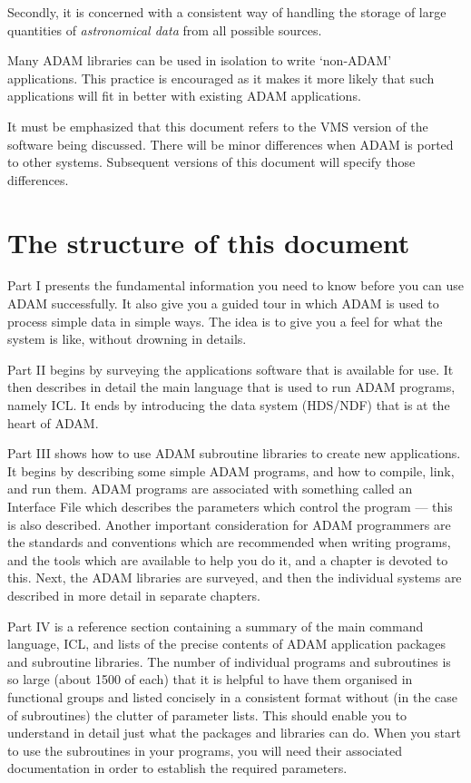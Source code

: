 Secondly, it is concerned with a consistent way of handling the storage of
large quantities of {\em astronomical data} from all possible sources.

Many ADAM libraries can be used in isolation to write `non-ADAM' applications.
This practice is encouraged as it makes it more likely that such applications
will fit in better with existing ADAM applications.

It must be emphasized that this document refers to the VMS version of the
software being discussed.
There will be minor differences when ADAM is ported to other systems.
Subsequent versions of this document will specify those differences.

\section{The structure of this document}
\label{S_strucdoc}

Part I presents the fundamental information you need to know before you can
use ADAM successfully.
It also give you a guided tour in which ADAM is used to process simple data
in simple ways.
The idea is to give you a feel for what the system is like, without drowning
in details.

Part II begins by surveying the applications software that is available for use.
It then describes in detail the main language that is used to run ADAM programs,
namely ICL.
It ends by introducing the data system (HDS/NDF) that is at the heart of ADAM.

Part III shows how to use ADAM subroutine libraries to create new applications.
It begins by describing some simple ADAM programs, and how to compile, link,
and run them.
ADAM programs are associated with something called an Interface File which
describes the parameters which control the program --- this is also described.
Another important consideration for ADAM programmers are the standards and
conventions which are recommended when writing programs, and the tools which
are available to help you do it, and a chapter is devoted to this.
Next, the ADAM libraries are surveyed, and then the individual systems are
described in more detail in separate chapters.

Part IV is a reference section containing a summary of the main command
language, ICL, and lists of the precise contents of ADAM application packages
and subroutine libraries.
The number of individual programs and subroutines is so large (about 1500 of
each) that it is helpful to have them organised in functional groups and listed
concisely in a consistent format without (in the case of subroutines) the
clutter of parameter lists.
This should enable you to understand in detail just what the packages and
libraries can do.
When you start to use the subroutines in your programs, you will need their
associated documentation in order to establish the required parameters.

